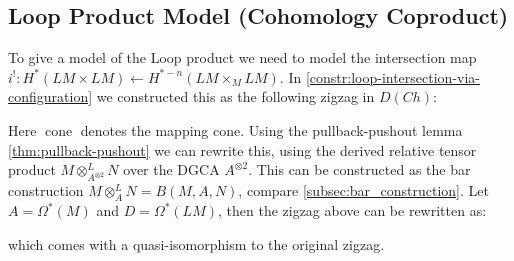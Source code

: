 \documentclass{scrartcl}
\theoremstyle{plain}
\theoremstyle{definition}
\DeclareMathOperator{\cone}{cone}
\newcommand{\quiso}{\simeq}
\newcommand{\from}{\leftarrow}
\DeclareMathOperator{\cConf}{\overline{Conf}}
\begin{document}
\subsection{Loop Product Model (Cohomology Coproduct)}\label{subsec:loop-product-model}
To give a model of the Loop product we need to model the intersection map $i^!\colon H^*(LM\times LM) \from H^{*-n}(LM\times_M LM)$. In \cref{constr:loop-intersection-via-configuration} we constructed this as the following zigzag in $D(Ch)$:
\begin{center}
\end{center}
Here $\cone$ denotes the mapping cone. Using the pullback-pushout lemma \ref{thm:pullback-pushout} we can rewrite this, using the derived relative tensor product $M\otimes^L_{A^{\otimes 2}}N$ over the DGCA $A^{\otimes 2}$. This can be constructed as the bar construction $M\otimes^L_A N = B(M, A, N)$, compare \cref{subsec:bar_construction}. Let $A=\Omega^*(M)$ and $D = \Omega^*(LM)$, then the zigzag above can be rewritten as: 
\begin{center}
\end{center}
which comes with a quasi-isomorphism to the original zigzag. 
\end{document}
